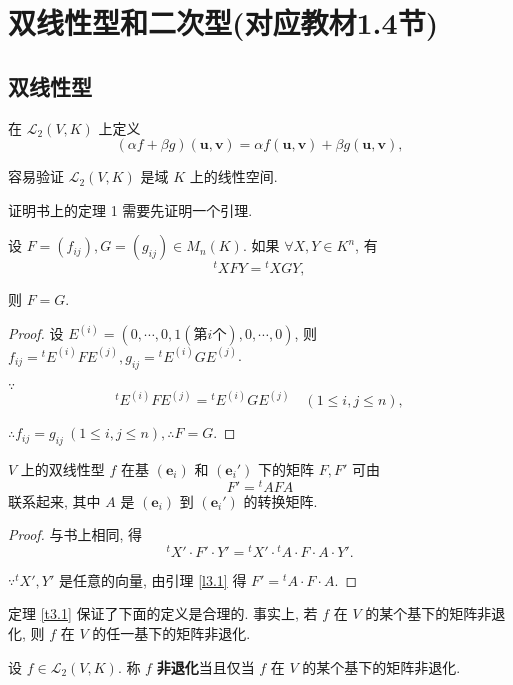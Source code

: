 \documentclass[color=black,device=normal,lang=cn,mode=geye]{elegantnote}
\begin{document}
\section{双线性型和二次型(对应教材1.4节)}
\subsection{双线性型}
在 $\mathcal{L}_2(V,K)$ 上定义
\[(\alpha f+\beta g)(\boldsymbol{u},\boldsymbol{v})=\alpha f(\boldsymbol{u},\boldsymbol{v})+\beta g(\boldsymbol{u},\boldsymbol{v}),\]

容易验证 $\mathcal{L}_2(V,K)$ 是域 $K$ 上的线性空间.

证明书上的定理 1 需要先证明一个引理.
\begin{lemma}\label{l3.1}
    设 $F=(f_{ij}),G=(g_{ij})\in M_n(K)$. 如果 $\forall X,Y\in K^n$, 有
    \[{}^tXFY={}^tXGY,\]

    则 $F=G$.
\end{lemma}
\begin{proof}
    设 $E^{(i)}=(0,\cdots,0,1(\text{第}i\text{个}),0,\cdots,0)$, 则 $f_{ij}={}^tE^{(i)}FE^{(j)},g_{ij}={}^tE^{(i)}GE^{(j)}$.

    $\because$
    \[{}^tE^{(i)}FE^{(j)}={}^tE^{(i)}GE^{(j)}\quad(1\leq i,j\leq n),\]

    $\therefore f_{ij}=g_{ij}\ (1\leq i,j\leq n),\therefore F=G$.
\end{proof}
\begin{theorem}[书上的定理 1]\label{t3.1}
    $V$ 上的双线性型 $f$ 在基 $(\boldsymbol{e}_i)$ 和 $(\boldsymbol{e}_i')$ 下的矩阵 $F,F'$ 可由
    \[F'={}^tAFA\]
    联系起来, 其中 $A$ 是 $(\boldsymbol{e}_i)$ 到 $(\boldsymbol{e}_i')$ 的转换矩阵.
\end{theorem}
\begin{proof}
    与书上相同, 得
    \[{}^tX'\cdot F'\cdot Y'={}^tX'\cdot{}^tA\cdot F\cdot A\cdot Y'.\]

    $\because{}^tX',Y'$ 是任意的向量, 由引理 \ref{l3.1} 得 $F'={}^tA\cdot F\cdot A$.
\end{proof}
定理 \ref{t3.1} 保证了下面的定义是合理的. 事实上, 若 $f$ 在 $V$ 的某个基下的矩阵非退化, 则 $f$ 在 $V$ 的任一基下的矩阵非退化.
\begin{definition}
    设 $f\in\mathcal{L}_2(V,K)$. 称 $f$ \textbf{非退化}当且仅当 $f$ 在 $V$ 的某个基下的矩阵非退化.
\end{definition}
\end{document}
